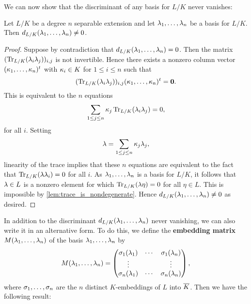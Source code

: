     We can now show that the discriminant of any basis for $L/K$ never vanishes:

    \begin{proposition}\label{prop:discriminant_not_zero}
      Let $L/K$ be a degree $n$ separable extension and let $\lambda_{1},\ldots,\lambda_{n}$ be a basis for $L/K$. Then $d_{L/K}(\lambda_{1},\ldots,\lambda_{n}) \neq 0$.
    \end{proposition}
    \begin{proof}
      Suppose by contradiction that $d_{L/K}(\lambda_{1},\ldots,\lambda_{n}) = 0$. Then the matrix $(\operatorname{\mathrm{Tr}}_{L/K}(\lambda_{i}\lambda_{j}))_{i,j}$ is not invertible. Hence there exists a nonzero column vector $(\kappa_{1},\ldots,\kappa_{n})^{t}$ with $\kappa_{i} \in K$ for $1 \le i \le n$ such that
      \[
        (\operatorname{\mathrm{Tr}}_{L/K}(\lambda_{i}\lambda_{j}))_{i,j}(\kappa_{1},\ldots,\kappa_{n})^{t} = \mathbf{0}.
      \]
      This is equivalent to the $n$ equations
      \[
        \sum_{1 \le j \le n}\kappa_{j}\operatorname{\mathrm{Tr}}_{L/K}(\lambda_{i}\lambda_{j}) = 0,
      \]
      for all $i$. Setting
      \[
        \lambda = \sum_{1 \le j \le n}\kappa_{j}\lambda_{j},
      \]
      linearity of the trace implies that these $n$ equations are equivalent to the fact that $\operatorname{\mathrm{Tr}}_{L/K}(\lambda\lambda_{i}) = 0$ for all $i$. As $\lambda_{1},\ldots,\lambda_{n}$ is a basis for $L/K$, it follows that $\lambda \in L$ is a nonzero element for which $\operatorname{\mathrm{Tr}}_{L/K}(\lambda\eta) = 0$ for all $\eta \in L$. This is impossible by \cref{lem:trace_is_nondegenerate}. Hence $d_{L/K}(\lambda_{1},\ldots,\lambda_{n}) \neq 0$ as desired.
    \end{proof}

    In addition to the discriminant $d_{L/K}(\lambda_{1},\ldots,\lambda_{n})$ never vanishing, we can also write it in an alternative form. To do this, we define the \textbf{embedding matrix} $M(\lambda_{1},\ldots,\lambda_{n})$ of the basis $\lambda_{1},\ldots,\lambda_{n}$ by
    \[
      M(\lambda_{1},\ldots,\lambda_{n}) = \begin{pmatrix} \sigma_{1}(\lambda_{1}) & \cdots & \sigma_{1}(\lambda_{n}) \\ \vdots & & \vdots \\ \sigma_{n}(\lambda_{1}) & \cdots & \sigma_{n}(\lambda_{n}) \end{pmatrix},
    \]
    where $\sigma_{1},\ldots,\sigma_{n}$ are the $n$ distinct $K$-embeddings of $L$ into $\overline{K}$. Then we have the following result:

